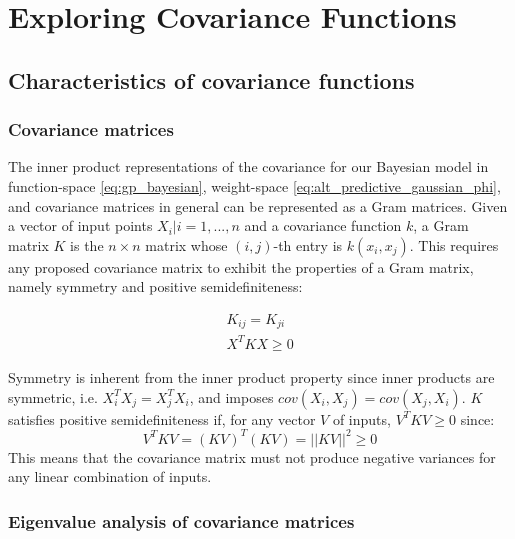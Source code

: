 \section{Exploring Covariance Functions}


\subsection{Characteristics of covariance functions \cite{gp-ml}}

\subsubsection{Covariance matrices}
The inner product representations of the covariance for our Bayesian model in function-space \ref{eq:gp_bayesian}, weight-space \ref{eq:alt_predictive_gaussian_phi}, and covariance matrices in general can be represented as a Gram matrices. Given a vector of input points ${X_i | i = 1, ..., n}$ and a covariance function $k$, a Gram matrix $K$ is the $n \times n$ matrix whose $(i,j)$-th entry is $k(x_i, x_j)$. This requires any proposed covariance matrix to exhibit the properties of a Gram matrix, namely symmetry and positive semidefiniteness:

\begin{equation*}
    \begin{aligned}
        K_{ij} = K_{ji} \\
        X^T K X \geq 0
    \end{aligned}
\end{equation*}

Symmetry is inherent from the inner product property since inner products are symmetric, i.e. $X_i^T X_j = X_j^T X_i$, and imposes $cov(X_i, X_j) = cov(X_j, X_i)$. $K$ satisfies positive semidefiniteness if, for any vector $V$ of inputs, $V^T K V \geq 0$ since:
\begin{equation*}
    V^T K V = (K V)^T (K V) = ||K V||^2 \geq 0
\end{equation*}
This means that the covariance matrix must not produce negative variances for any linear combination of inputs.


\subsubsection{Eigenvalue analysis of covariance matrices}

